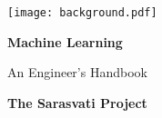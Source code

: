 \titlepage %
	{\texttt{[image: background.pdf]}} %
	{ %
		\centering\sffamily %
		{\Huge\bfseries Machine Learning\par} %
		\vspace{16pt} %
		{\LARGE An Engineer's Handbook\par} %
		\vspace{24pt} %
		{\huge\bfseries The Sarasvati Project\par} %
	}